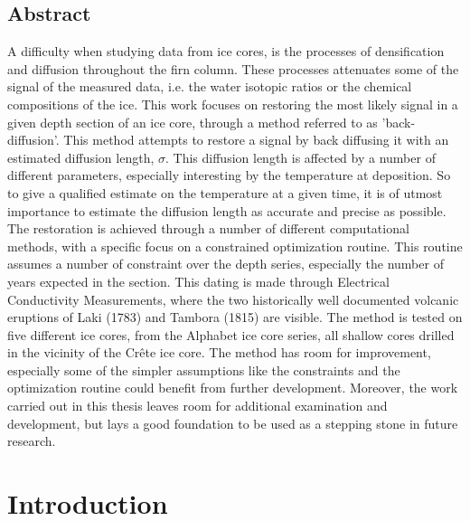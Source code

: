 \documentclass[11pt]{memoir} %
\begin{document}
\section*{Abstract}
\label{Abstract}
A difficulty when studying data from ice cores, is the processes of densification and diffusion throughout the firn column. These processes attenuates some of the signal of the measured data, i.e. the water isotopic ratios or the chemical compositions of the ice. This work focuses on restoring the most likely signal in a given depth section of an ice core, through a method referred to as 'back-diffusion'. This method attempts to restore a signal by back diffusing it with an estimated diffusion length, $\sigma$. This diffusion length is affected by a number of different parameters, especially interesting by the temperature at deposition. So to give a qualified estimate on the temperature at a given time, it is of utmost importance to estimate the diffusion length as accurate and precise as possible. The restoration is achieved through a number of different computational methods, with a specific focus on a constrained optimization routine. This routine assumes a number of constraint over the depth series, especially the number of years expected in the section. This dating is made through Electrical Conductivity Measurements, where the two historically well documented volcanic eruptions of Laki (1783) and Tambora (1815) are visible. The method is tested on five different ice cores, from the Alphabet ice core series, all shallow cores drilled in the vicinity of the Crête ice core.
The method has room for improvement, especially some of the simpler assumptions like the constraints and the optimization routine could benefit from further development. Moreover, the work carried out in this thesis leaves room for additional examination and development, but lays a good foundation to be used as a stepping stone in future research.
\newpage


\tableofcontents \mtcaddchapter




\newpage

\listoffigures \mtcaddchapter

\listoftables \mtcaddchapter 



\mainmatter
	



\chapter[Introduction][Introduction]{Introduction}
\label{Chap:Intro}

\end{document}
